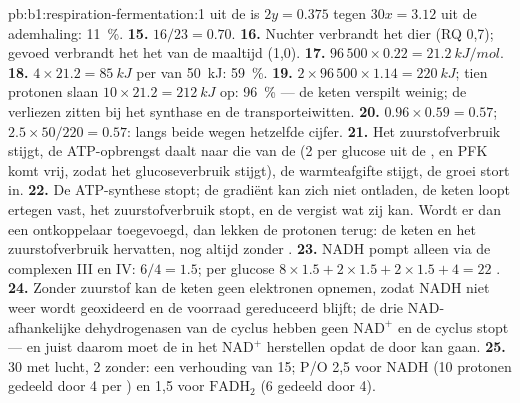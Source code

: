 \begin{solution}{pb:b1:respiration-fermentation:1}
uit de  is $2y = 0.375$ tegen $30x = 3.12$ uit de ademhaling: \qty{11}{\%}.
\textbf{15.} $16/23 = 0.70$.
\textbf{16.} Nuchter verbrandt het dier  (RQ 0,7); gevoed verbrandt het het
 van de maaltijd (1,0).
\textbf{17.} $96\,500\times 0.22 = \qty{21.2}{kJ/mol}$.
\textbf{18.} $4\times 21.2 = \qty{85}{kJ}$ per  van \qty{50}{kJ}: \qty{59}{\%}.
\textbf{19.} $2\times 96\,500\times 1.14 = \qty{220}{kJ}$; tien protonen slaan
$10\times 21.2 = \qty{212}{kJ}$ op: \qty{96}{\%} --- de keten verspilt weinig; de
verliezen zitten bij het synthase en de transporteiwitten.
\textbf{20.} $0.96\times 0.59 = 0.57$; $2.5\times 50/220 = 0.57$: langs beide wegen
hetzelfde cijfer.
\textbf{21.} Het zuurstofverbruik stijgt, de ATP-opbrengst daalt naar die van de
 (2 per glucose uit de , en PFK komt vrij, zodat het
glucoseverbruik stijgt), de warmteafgifte stijgt, de groei stort in.
\textbf{22.} De ATP-synthese stopt; de gradiënt kan zich niet ontladen, de keten
loopt ertegen vast, het zuurstofverbruik stopt, en de  vergist wat zij kan. Wordt
er dan een ontkoppelaar toegevoegd, dan lekken de protonen terug: de keten en het
zuurstofverbruik hervatten, nog altijd zonder .
\textbf{23.} NADH pompt alleen via de complexen III en IV: $6/4 = 1.5$; per
glucose $8\times 1.5 + 2\times 1.5 + 2\times 1.5 + 4 = 22$ .
\textbf{24.} Zonder zuurstof kan de keten geen elektronen opnemen, zodat NADH niet
weer wordt geoxideerd en de voorraad gereduceerd blijft; de drie NAD-afhankelijke
dehydrogenasen van de cyclus hebben geen $\mathrm{NAD^+}$ en de cyclus stopt ---
en juist daarom moet de  in het  $\mathrm{NAD^+}$ herstellen opdat de
 door kan gaan.
\textbf{25.} 30  met lucht, 2 zonder: een verhouding van 15; P/O 2,5 voor NADH
(10 protonen gedeeld door 4 per ) en 1,5 voor $\mathrm{FADH_2}$ (6 gedeeld door
4).
\end{solution}
